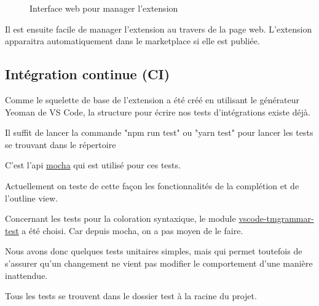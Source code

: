 \documentclass[
    iict, %
    il, %
]{heig-tb}
\begin{document}
\begin{figure}[!h]
    \begin{center}
    \end{center}
    \caption[Interface web pour manager l'extension]{\label{manage-publisher} Interface web pour manager l'extension}
\end{figure}

Il est ensuite facile de manager l'extension au travers de la page web.
L'extension apparaitra automatiquement dans le marketplace si elle est publiée.

\subsection{Intégration continue (CI)}

Comme le squelette de base de l'extension a été créé en utilisant le générateur Yeoman de VS Code, la structure pour écrire nos tests d'intégrations
existe déjà.

Il suffit de lancer la commande "npm run test" ou "yarn test" pour lancer les tests se trouvant dans le répertoire %

C'est l'api \href{https://mochajs.org/api/}{mocha} qui est utilisé pour ces tests.

Actuellement on teste de cette façon les fonctionnalités de la complétion et de l'outline view.

Concernant les tests pour la coloration syntaxique, le module \href{https://github.com/PanAeon/vscode-tmgrammar-test}{vscode-tmgrammar-test} a été choisi.
Car depuis mocha, on a pas moyen de le faire.

Nous avons donc quelques tests unitaires simples, mais qui permet toutefois de s'assurer qu'un changement ne vient pas modifier le comportement d'une manière inattendue.

Tous les tests se trouvent dans le dossier test à la racine du projet. %
\end{document}
